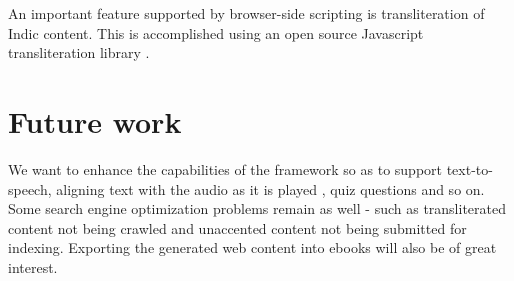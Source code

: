 \documentclass[11pt]{article}
\begin{document}
An important feature supported by browser-side scripting is transliteration of Indic content. This is accomplished using an open source Javascript transliteration library \cite{sanscript_js}.

\section{Future work}
We want to enhance the capabilities of the framework so as to support text-to-speech, aligning text with the audio as it is played \cite{avinash_audio}, quiz questions and so on. Some search engine optimization problems remain as well - such as transliterated content not being crawled and unaccented content not being submitted for indexing. Exporting the generated web content into ebooks will also be of great interest.



\end{document}
